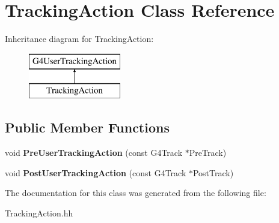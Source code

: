 \hypertarget{classTrackingAction}{\section{Tracking\-Action Class Reference}
\label{classTrackingAction}
}
Inheritance diagram for Tracking\-Action\-:\begin{figure}[H]
\begin{center}
\leavevmode
\includegraphics[height=2.000000cm]{classTrackingAction}
\end{center}
\end{figure}
\subsection*{Public Member Functions}
\begin{DoxyCompactItemize}
\item 
\hypertarget{classTrackingAction_a5848e62db322beec1509cbdeb56d8ae7}{void {\bfseries Pre\-User\-Tracking\-Action} (const G4\-Track $\ast$Pre\-Track)}\label{classTrackingAction_a5848e62db322beec1509cbdeb56d8ae7}

\item 
\hypertarget{classTrackingAction_a7d7da36a128b21bdbda7ff92218dec9c}{void {\bfseries Post\-User\-Tracking\-Action} (const G4\-Track $\ast$Post\-Track)}\label{classTrackingAction_a7d7da36a128b21bdbda7ff92218dec9c}

\end{DoxyCompactItemize}


The documentation for this class was generated from the following file\-:\begin{DoxyCompactItemize}
\item 
Tracking\-Action.\-hh\end{DoxyCompactItemize}
